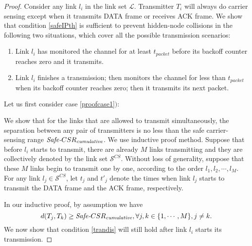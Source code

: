 \documentclass[conference]{IEEEtran}
\begin{document}
\begin{proof}
Consider any link $l_i$ in the link set $\mathcal{L}$. Transmitter
$T_i$ will always do carrier sensing except when it transmits DATA
frame or receives ACK frame. We show that condition \eqref{safeIPth}
is suff\/icient to prevent hidden-node collisions in the following
two situations, which cover all the possible transmission scenarios:
\begin{enumerate}
\item{Link $l_i$ has monitored the channel for at least $t_{packet}$
before its backoff counter reaches zero and it
transmits.}\label{proofcase1}
\item{Link $l_i$ f\/inishes a transmission; then monitors the channel
for less than $t_{packet}$ when its backoff counter reaches zero;
then it transmits its next packet.}\label{proofcase2}
\end{enumerate}

Let us f\/irst consider case \ref{proofcase1}$)$:

We show that for the links that are allowed to transmit
simultaneously, the separation between any pair of transmitters is
no less than the safe carrier-sensing range
$\text{\emph{Safe-}}CSR_\text{\emph{cumulative}}$. We use inductive
proof method. Suppose that before $l_i$ starts to transmit, there
are already $M$ links transmitting and they are collectively denoted
by the link set $\mathcal{S}^{ CS}$. Without loss of generality,
suppose that these $M$ links begin to transmit one by one, according
to the order $l_1,l_2,\cdots,l_M$. For any link $l_j\in\mathcal{S}^{
CS}$, let $t_j$ and $t'_j$ denote the times when link $l_j$ starts
to transmit the DATA frame and the ACK frame, respectively.

In our inductive proof, by assumption we have \begin{equation}
d(T_j,T_k)\geq \text{\emph{Safe-}}CSR_\text{\emph{cumulative}},
\forall j,k\in\{1,\cdots,M\}, j\neq k.\label{trandis}
\end{equation}
We now show that condition \eqref{trandis} will still hold after
link $l_i$ starts its transmission.


\end{proof}
\end{document}
